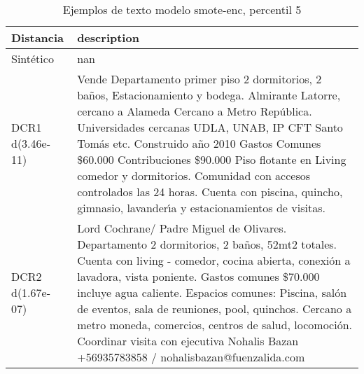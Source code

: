 \begin{table}[H]
\centering
\fontsize{10}{14}\selectfont
\caption{Ejemplos de texto modelo smote-enc, percentil 5}
\label{table-example-economicos-a-2-smote-enc-5p-text}
\begin{tabular}{|l|m{35em}|}
\hline
\rowcolor[gray]{0.8}
Distancia & description \\
\hline Sintético & nan \\
\hline DCR1 d(3.46e-11) & Vende Departamento primer piso 2 dormitorios, 2 ba\~nos, Estacionamiento y bodega. Almirante Latorre, cercano a Alameda Cercano a Metro Rep\'ublica. Universidades cercanas UDLA, UNAB, IP CFT Santo Tom\'as etc. Construido a\~no 2010 Gastos Comunes \$60.000 Contribuciones \$90.000 Piso flotante en Living comedor y dormitorios. Comunidad con accesos controlados las 24 horas. Cuenta con piscina, quincho, gimnasio, lavander{\'\i}a y estacionamientos de visitas. \\
\hline DCR2 d(1.67e-07) & Lord Cochrane/ Padre Miguel de Olivares. Departamento 2 dormitorios, 2 ba\~nos, 52mt2 totales. Cuenta con living - comedor, cocina abierta, conexi\'on a lavadora, vista poniente. Gastos comunes \$70.000 incluye agua caliente. Espacios comunes: Piscina, sal\'on de eventos, sala de reuniones, pool, quinchos. Cercano a metro moneda, comercios, centros de salud, locomoci\'on.  Coordinar visita con ejecutiva Nohalis Bazan +56935783858 / nohalisbazan@fuenzalida.com \\
\hline
\end{tabular}
\end{table}
